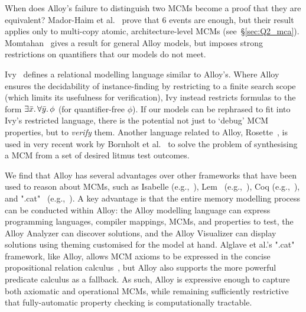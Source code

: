 When does Alloy's failure to distinguish two MCMs become a proof that
they are equivalent? Mador-Haim et al.~\cite{mador-haim+11} prove that
6 events are enough, but their result applies only to multi-copy
atomic, architecture-level MCMs (see~\S\ref{sec:Q2_mca}). Momtahan~\cite{momtahan05} gives a result for
general Alloy models, but imposes strong restrictions on
quantifiers that our models do not meet.

Ivy~\cite{padon+16} defines a relational modelling language similar to
Alloy's. Where Alloy ensures the decidability of instance-finding by
restricting to a finite search scope (which limits its usefulness for
verification), Ivy instead restricts formulas to the form
$\exists\bar{x}\ldotp\forall\bar{y}\ldotp\phi$ (for quantifier-free
$\phi$). If our models can be rephrased to fit into Ivy's restricted
language, there is the potential not just to `debug' MCM properties,
but to \emph{verify} them. Another language related to Alloy,
Rosette~\cite{torlak+13a}, is used in very recent work by Bornholt et
al.~\cite{bornholt+16} to solve the problem of synthesising a MCM from
a set of desired litmus test outcomes.

We find that Alloy has several advantages over other frameworks that
have been used to reason about MCMs, such as Isabelle
(e.g.,~\cite{batty+11}), Lem~\cite{mulligan+14}
(e.g.,~\cite{batty+12}), Coq (e.g.,~\cite{vafeiadis+15}), and
".cat"~\cite{alglave+14} (e.g.,~\cite{batty+16}). A key advantage is
that the entire memory modelling process can be conducted within
Alloy: the Alloy modelling language can express programming languages,
compiler mappings, MCMs, and properties to test, the Alloy Analyzer
can discover solutions, and the Alloy Visualizer can display solutions
using theming customised for the model at hand. Alglave et al.'s
".cat" framework, like Alloy, allows MCM axioms to be expressed in the
concise propositional relation calculus~\cite{tarski41}, but Alloy
also supports the more powerful predicate calculus as a fallback. As
such, Alloy is expressive enough to capture both axiomatic and
operational MCMs, while remaining sufficiently restrictive that
fully-automatic property checking is computationally tractable.


